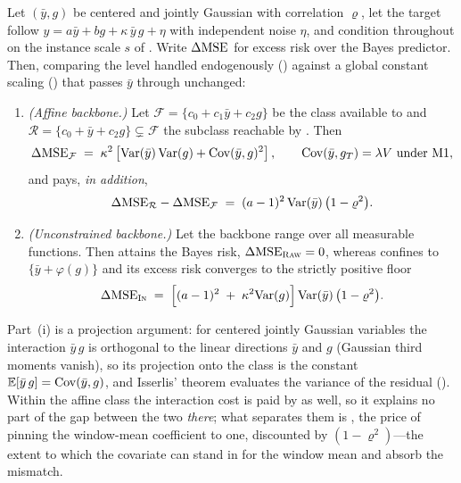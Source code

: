 \setcounter{proposition}{0}
\begin{proposition}\label{prop:deficiency}
Let $(\bar y, g)$ be centered and jointly Gaussian with correlation $\varrho$, let the target follow
$y = a\bar y + b g + \kappa\, \bar y\, g + \eta$ with independent noise $\eta$, and condition throughout on the instance scale $s$ of . Write $\Delta\mathrm{MSE}$ for excess risk over the Bayes predictor. Then, comparing the level handled endogenously (\inm) against a global constant scaling (\rawm) that passes $\bar y$ through unchanged:
\begin{enumerate}
  \item[(i)] \emph{(Affine backbone.)} Let $\mathcal{F} = \{c_0 + c_1 \bar y + c_2 g\}$ be the class available to \rawm{} and $\mathcal{R} = \{c_0 + \bar y + c_2 g\} \subsetneq \mathcal{F}$ the subclass reachable by . Then
  \begin{equation}\label{eq:prop1}
    \Delta\mathrm{MSE}_{\mathcal{F}} \;=\; \kappa^2\left[\mathrm{Var}(\bar y)\,\mathrm{Var}(g) + \mathrm{Cov}(\bar y, g)^2\right],
    \qquad \mathrm{Cov}(\bar y, g_T) = \lambda V \text{ under M1},
  \end{equation}
  and \inm{} pays, \emph{in addition},
  \begin{equation}\label{eq:prop1b}
    \Delta\mathrm{MSE}_{\mathcal{R}} - \Delta\mathrm{MSE}_{\mathcal{F}} \;=\; (a-1)^2\,\mathrm{Var}(\bar y)\,\bigl(1-\varrho^2\bigr).
  \end{equation}
  \item[(ii)] \emph{(Unconstrained backbone.)} Let the backbone range over all measurable functions. Then \rawm{} attains the Bayes risk, $\Delta\mathrm{MSE}_{\textsc{Raw}} = 0$, whereas  confines \inm{} to $\{\bar y + \varphi(g)\}$ and its excess risk converges to the strictly positive floor
  \begin{equation}\label{eq:prop1c}
    \Delta\mathrm{MSE}_{\textsc{In}} \;=\; \Bigl[(a-1)^2 \;+\; \kappa^2\mathrm{Var}(g)\Bigr]\,\mathrm{Var}(\bar y)\,\bigl(1-\varrho^2\bigr).
  \end{equation}
\end{enumerate}
\end{proposition}

Part~(i) is a projection argument: for centered jointly Gaussian variables the interaction $\bar y\, g$ is orthogonal to the linear directions $\bar y$ and $g$ (Gaussian third moments vanish), so its projection onto the class is the constant $\mathbb{E}[\bar y\, g] = \mathrm{Cov}(\bar y, g)$, and Isserlis' theorem evaluates the variance of the residual (). Within the affine class the interaction cost  is paid by \rawm{} as well, so it explains no part of the gap between the two \emph{there}; what separates them is , the price of pinning the window-mean coefficient to one, discounted by $(1-\varrho^2)$---the extent to which the covariate can stand in for the window mean and absorb the mismatch.

